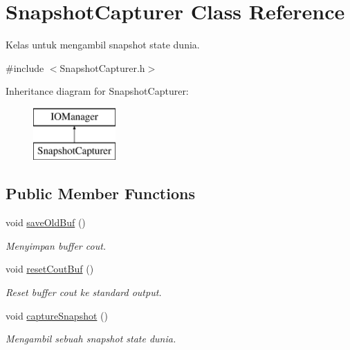 \hypertarget{class_snapshot_capturer}{}\section{Snapshot\+Capturer Class Reference}
\label{class_snapshot_capturer}


Kelas untuk mengambil snapshot state dunia.  




{\ttfamily \#include $<$Snapshot\+Capturer.\+h$>$}

Inheritance diagram for Snapshot\+Capturer\+:\begin{figure}[H]
\begin{center}
\leavevmode
\includegraphics[height=2.000000cm]{class_snapshot_capturer}
\end{center}
\end{figure}
\subsection*{Public Member Functions}
\begin{DoxyCompactItemize}
\item 
void \hyperlink{class_snapshot_capturer_a905be74885968e52e8df43f138260ede}{save\+Old\+Buf} ()
\begin{DoxyCompactList}\small\item\em Menyimpan buffer cout. \end{DoxyCompactList}\item 
void \hyperlink{class_snapshot_capturer_aae816fa4d192adc4eae98fc0fda46db1}{reset\+Cout\+Buf} ()
\begin{DoxyCompactList}\small\item\em Reset buffer cout ke standard output. \end{DoxyCompactList}\item 
void \hyperlink{class_snapshot_capturer_a17c1677e94e0cb1e5a17febbb146c4bc}{capture\+Snapshot} ()
\begin{DoxyCompactList}\small\item\em Mengambil sebuah snapshot state dunia. \end{DoxyCompactList}\end{DoxyCompactItemize}
